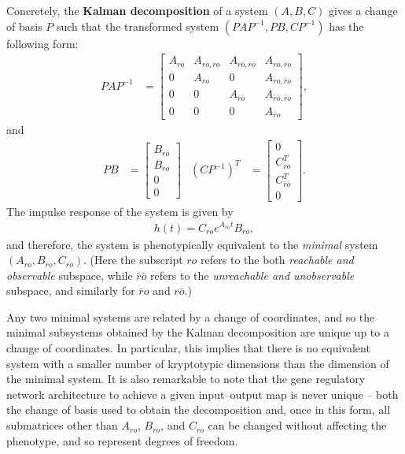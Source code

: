 \documentclass{article}
\newcommand{\ro}{{ro}}
\newcommand{\nro}{{\bar{r}o}}
\newcommand{\rno}{{r\bar{o}}}
\newcommand{\nrno}{{\bar{r}\bar{o}}}
\newcommand{\1}{\mathbbm{1}}
\begin{document}
Concretely, the \textbf{Kalman decomposition} of a system $(A,B,C)$  
gives a change of basis $P$ such that
the transformed system $(PAP^{-1},PB,CP^{-1})$  has the following form:
\begin{align*}
       PAP^{-1}
       &=
       \left[ \begin{array}{cccc}
           A_{\rno} & A_{\rno,\ro} & A_{\rno,\nrno} & A_{\rno,\nro} \\
           0 & A_{\ro} & 0 & A_{\ro,\nro} \\
           0 & 0 & A_{\nrno} & A_{\nrno,\nro} \\
          0 & 0 & 0 & A_{\nro}
       \end{array} \right] ,
\end{align*}
and
\begin{align*}
     PB
     &=
    \left[ \begin{array}{cccc}
         B_{\rno} \\
         B_{\ro} \\
         0 \\
         0 
   \end{array} \right] 
   &
   (CP^{-1})^T
   &=
   \left[ \begin{array}{cccc}
       0 \\
       C_{\ro}^T \\
       C_{\nrno}^T \\
       0 
   \end{array} \right] .
\end{align*}
The impulse response of the system is given by
\begin{align*}
      h(t) = C_{\ro} e^{A_{\ro} t} B_{\ro},
\end{align*}
and therefore, the system is phenotypically equivalent to the \emph{minimal} system $(A_{\ro}, B_{\ro}, C_{\ro})$.
(Here the subscript $\ro$ refers to the both \emph{reachable and observable} subspace,
while $\nrno$ refers to the \emph{unreachable and unobservable} subspace,
and similarly for $\nro$ and $\rno$.)

Any two minimal systems are related by a change of coordinates,
and so the minimal subsystems obtained by the Kalman decomposition
are unique up to a change of coordinates.
In particular, this implies that there is no equivalent system with a smaller number of kryptotypic dimensions
than the dimension of the minimal system.
It is also remarkable to note that the gene regulatory network architecture to achieve a given input--output map is never unique --
both the change of basis used to obtain the decomposition
and, once in this form, all submatrices other than $A_{\ro}$, $B_{\ro}$, and $C_{\ro}$ can be changed without affecting the phenotype,
and so represent degrees of freedom.
\end{document}
